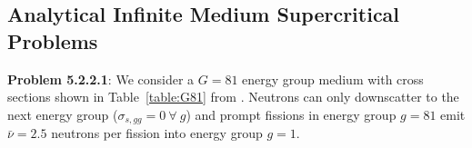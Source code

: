 
\subsection{Analytical Infinite Medium Supercritical Problems}


\textbf{Problem 5.2.2.1}: We consider a $G = 81$ energy group medium with cross sections shown in Table~\ref{table:G81} from \cite{Betzler2014Alpha}. Neutrons can only downscatter to the next energy group ($\sigma_{s,gg} = 0 \: \forall  \: g$) and prompt fissions in energy group $g = 81$ emit $\bar{\nu} = 2.5$ neutrons per fission into energy group $g = 1$.

